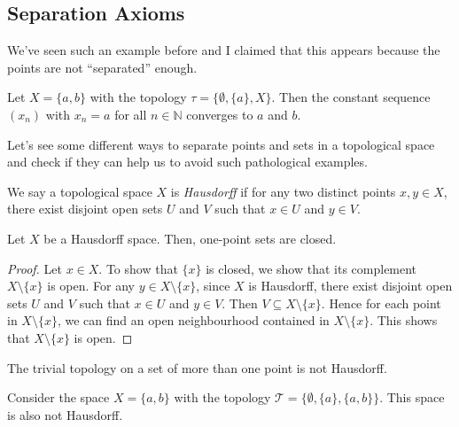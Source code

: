 
\subsection{Separation Axioms}
We've seen such an example before and I claimed that this appears because the points are not ``separated'' enough. 
\begin{example}
    Let $X=\{a,b\}$ with the topology $\tau=\{\emptyset,\{a\},X\}$. Then the constant sequence $(x_n)$ with $x_n=a$ for all $n\in\mathbb{N}$ converges to $a$ and $b$. 
\end{example}

Let's see some different ways to separate points and sets in a topological space and check if they can help us to avoid such pathological examples.

\begin{definition}
    We say a topological space \(X\) is \emph{Hausdorff} if for any two distinct points \(x, y \in X\), there exist disjoint open sets \(U\) and \(V\) such that \(x \in U\) and \(y \in V\).
\end{definition}

\begin{lemma}
    Let $X$ be a Hausdorff space. Then, one-point sets are closed.
\end{lemma}
\begin{proof}
    Let $x\in X$. To show that $\{x\}$ is closed, we show that its complement $X\setminus\{x\}$ is open. For any $y\in X\setminus\{x\}$, since $X$ is Hausdorff, there exist disjoint open sets $U$ and $V$ such that $x\in U$ and $y\in V$. Then $V\subseteq X\setminus\{x\}$. Hence for each point in $X\setminus\{x\}$, we can find an open neighbourhood contained in $X\setminus\{x\}$. This shows that $X\setminus\{x\}$ is open.
\end{proof}

\begin{example}
    The trivial topology on a set of more than one point is not Hausdorff.
\end{example}

\begin{example}
    Consider the space \(X=\{a,b\}\) with the topology \(\mathcal{T}=\{\emptyset, \{a\}, \{a,b\}\}\). This space is also not Hausdorff.
\end{example}

